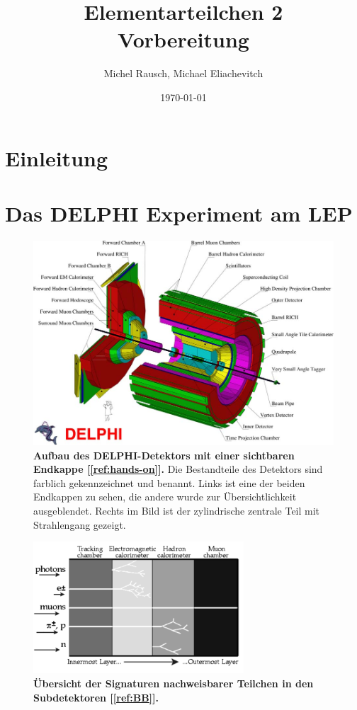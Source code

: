 \documentclass[a4paper,ngerman]{scrartcl}
\title{Elementarteilchen 2\\Vorbereitung}
\date{\today}
\author{Michel Rausch, Michael Eliachevitch}
\begin{document}
\maketitle
\tableofcontents
\newpage

\section{Einleitung}

\section{Das DELPHI Experiment am LEP}
\label{sec:delphi}

\begin{figure}
\centering
\includegraphics[width=\textwidth]{abbildungen/delphi_big.png}
\caption{\textbf{Aufbau des DELPHI-Detektors mit einer sichtbaren Endkappe [\ref{ref:hands-on}].} 
Die Bestandteile des Detektors sind farblich gekennzeichnet und benannt.
Links ist eine der beiden Endkappen zu sehen, die andere wurde zur Übersichtlichkeit ausgeblendet.
Rechts im Bild ist der zylindrische zentrale Teil mit Strahlengang gezeigt. 
}
\label{fig:delphi_big}
\end{figure}





\begin{figure}
\centering
\includegraphics[width=0.7\textwidth]{abbildungen/delphi_schichten.png}
\caption{\textbf{Übersicht der Signaturen nachweisbarer Teilchen in den Subdetektoren [\ref{ref:BB}].} 
}
\label{fig:delphi_schichten}
\end{figure}
\end{document}
